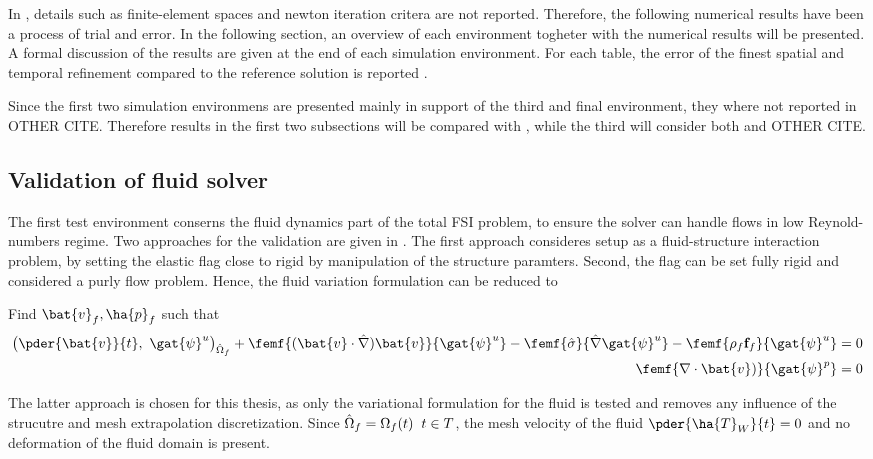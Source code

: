 In \cite{Hron2006}, details such as  finite-element spaces and newton iteration critera are not reported. Therefore, the following numerical results have been a process of trial and error. In the following section, an overview of each environment togheter with  the numerical results will be presented. A formal discussion of the results are given at the end of each simulation environment. For each table, the error of the finest spatial and temporal refinement compared to the reference solution is reported .

 Since the first two simulation environmens are presented mainly in support of the third and final environment, they where not reported in OTHER CITE. Therefore results in the first two subsections  will be compared with \cite{Hron2006}, while the third will consider both \cite{Hron2006} and OTHER CITE.

 \newpage
\subsection{Validation of fluid solver}
The first test environment conserns the fluid dynamics part of the total FSI problem, to ensure the solver can handle flows in low Reynold-numbers regime. Two approaches for the validation are given in \cite{Hron2006}. The first approach consideres setup as a fluid-structure interaction problem, by setting the elastic flag close to rigid  by manipulation of the structure paramters. Second, the flag can be set fully rigid and considered a purly flow problem.  Hence, the fluid variation formulation can be reduced to


Find $\bat{v}_f, \ha{p}_f $ such that
\begin{align*}
 \big( \pder{\bat{v}}{t}, \ \gat{\psi}^u \big)_{\hat{\Omega}_f} +
\femf{(\bat{v} \cdot \hat{\nabla}) \bat{v}}{\gat{\psi}^u}
- \femf{\hat{\sigma}}{\hat{\nabla}\gat{\psi}^u} -
\femf{\rho_f  \mathbf{f}_f}{{\gat{\psi}^u}} = 0 \\
\femf{\nabla \cdot \bat{v})}{\gat{\psi}^p} = 0 
\end{align*} 

The latter approach is chosen for this thesis, as only the variational formulation for the fluid is tested and removes any influence of the strucutre and mesh extrapolation discretization.  Since $\hat{\Omega}_f = {\Omega}_f(t) \hspace{2mm} t \in T$, the mesh velocity of the fluid $ \pder{\ha{T}_W}{t} = 0$  and no deformation of the fluid domain is present.

